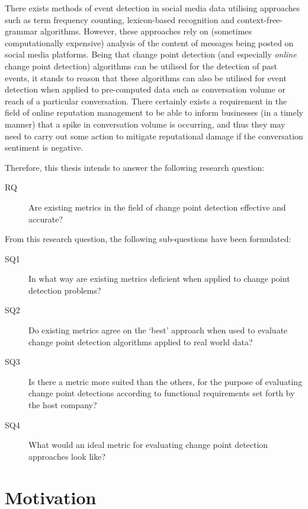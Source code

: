 \documentclass[../main.tex]{subfiles}
\begin{document}
There exists methods of event detection in social media data utilising approaches such as term frequency counting, lexicon-based recognition and context-free-grammar algorithms. However, these approaches rely on (sometimes computationally expensive) analysis of the content of messages being posted on social media platforms. Being that change point detection (and especially \emph{online} change point detection) algorithms can be utilised for the detection of past events, it stands to reason that these algorithms can also be utilised for event detection when applied to pre-computed data such as conversation volume or reach of a particular conversation. There certainly exists a requirement in the field of online reputation management to be able to inform businesses (in a timely manner) that a spike in conversation volume is occurring, and thus they may need to carry out some action to mitigate reputational damage if the conversation sentiment is negative.

Therefore, this thesis intends to answer the following research question:

\begin{description}
    \item[RQ] Are existing metrics in the field of change point detection effective and accurate?
\end{description}

From this research question, the following sub-questions have been formulated:

\begin{description}
    \item[SQ1] In what way are existing metrics deficient when applied to change point detection problems?
    \item[SQ2] Do existing metrics agree on the `best' approach when used to evaluate change point detection algorithms applied to real world data?
    \item[SQ3] Is there a metric more suited than the others, for the purpose of evaluating change point detections according to functional requirements set forth by the host company?
    \item[SQ4] What would an ideal metric for evaluating change point detection approaches look like?
\end{description}

\section{Motivation}
\end{document}
